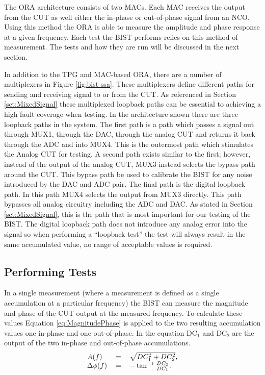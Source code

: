 \documentclass[12pt]{report}
\begin{document}
The ORA architecture consists of two MACs.  Each MAC receives the output from the CUT as well either the in-phase or out-of-phase signal from an NCO.  Using this method the ORA is able to measure the amplitude and phase response at a given frequency\cite{testtime}.  Each test the BIST performs relies on this method of measurement.  The tests and how they are run will be discussed in the next section.

In addition to the TPG and MAC-based ORA, there are a number of multiplexers in Figure \ref{fig:bist-ssa}.  These multiplexers define different paths for sending and receiving signal to or from the CUT.  As referenced in Section \ref{sct:MixedSignal} these multiplexed loopback paths can be essential to achieving a high fault coverage when testing.  In the architecture shown there are three loopback paths in the system.  The first path is a path which passes a signal out through MUX1, through the DAC, through the analog CUT and returns it back through the ADC and into MUX4.  This is the outermost path which stimulates the Analog CUT for testing.  A second path exists similar to the first; however, instead of the output of the analog CUT, MUX3 instead selects the bypass path around the CUT.  This bypass path be used to calibrate the BIST for any noise introduced by the DAC and ADC pair.  The final path is the digital loopback path.  In this path MUX4 selects the output from MUX3 directly.  This path bypasses all analog circuitry including the ADC and DAC.  As stated in Section \ref{sct:MixedSignal}, this is the path that is most important for our testing of the BIST.  The digital loopback path does not introduce any analog error into the signal so when performing a ``loopback test'' the test will always result in the same accumulated value, no range of acceptable values is required\cite{stroud-analog}.

\subsection{Performing Tests}
In a single measurement (where a measurement is defined as a single accumulation at a particular frequency) the BIST can measure the magnitude and phase of the CUT output at the measured frequency.  To calculate these values Equation \ref{eq:MagnitudePhase} is applied to the two resulting accumulation values one in-phase and one out-of-phase\cite{jie}.  In the equation DC$_1$ and DC$_2$ are the output of the two in-phase and out-of-phase accumulations.
\begin{equation}
  \begin{tabular}{lll}
	$A(f)$ & $=$ & $\sqrt{DC_1^2+DC_2^2}, \nonumber$ \\
	  $\Delta\phi(f)$ & $=$ & $-\tan^{-1}\frac{DC_2}{DC_1}.$
  \end{tabular}
  \label{eq:MagnitudePhase}
\end{equation}
\end{document}
